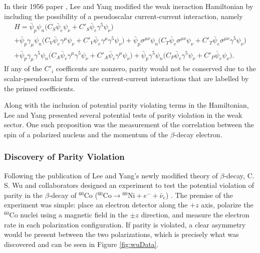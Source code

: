 In their 1956 paper \cite{leeyang1956}, Lee and Yang modified the weak ineraction Hamiltonian
by including the possibility of a pseudoscalar current-current interaction, namely
%
\begin{multline}
  H = \bar{\psi}_p \psi_n \big( C_S\bar{\psi}_e  \psi_\nu + C'_S\bar{\psi}_e \gamma^5 \psi_\nu \big) \\
  + \bar{\psi}_p \gamma_\mu \psi_n  \big( C_V\bar{\psi}_e \gamma^\mu \psi_\nu + C'_V\bar{\psi}_e \gamma^\mu \gamma^5 \psi_\nu \big) 
  + \bar{\psi}_p \sigma^{\mu\nu} \psi_n \big( C_T\bar{\psi}_e \sigma^{\mu\nu} \psi_\nu + C'_T\bar{\psi}_e \sigma^{\mu\nu} \gamma^5 \psi_\nu \big)\\
  + \bar{\psi}_p \gamma_\mu \gamma^5 \psi_n \big( C_A\bar{\psi}_e \gamma^\mu \gamma^5 \psi_\nu + C'_A\bar{\psi}_e \gamma^\mu \psi_\nu \big) 
  + \bar{\psi}_p  \gamma^5 \psi_n \big( C_P\bar{\psi}_e  \gamma^5 \psi_\nu + C'_P\bar{\psi}_e \psi_\nu \big).
  \label{eq:leeyang}
\end{multline}
%
If any of the $C'_i$ coefficents are nonzero, parity would not be conserved due to
the scalar-pseudoscalar form of the current-current interactions that are labelled by
the primed coefficients.

Along with the inclusion of potential parity violating terms in the Hamiltonian, Lee and Yang
presented several potential tests of parity violation in the weak sector. One such proposition
was the measurement of the correlation between the spin of a polarized nucleus and
the momentum of the $\beta$-decay electron.

\subsubsection{Discovery of Parity Violation}

Following the publication of Lee and Yang's newly modified theory of $\beta$-decay, C. S. Wu
and collaborators designed an experiment to test the potential violation
of parity in the $\beta$-decay of $^{60}\mathrm{Co}$
($^{60}\mathrm{Co} \rightarrow {^{60}\mathrm{Ni}} + e^- + \bar{\nu}_e$) \cite{wu1957}. The premise of the experiment
was simple: place an electron detector along the $+z$ axis, polarize the $^{60}\mathrm{Co}$ nuclei
using a magnetic field in the $\pm z$ direction, and measure the electron rate in each polarization
configuration. If parity is violated, a clear asymmetry would be present between the two polarizations,
which is precisely what was discovered and can be seen in Figure \ref{fig:wuData}.

